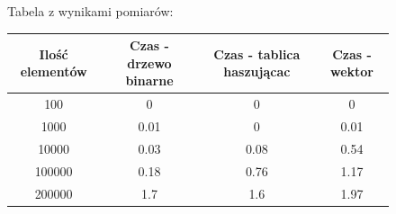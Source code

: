 \documentclass[a4paper,11pt]{report}
\begin{document}
\begin{figure}
  \begin{center}
  Tabela z wynikami pomiarów:\\
  \begin{tabular}{|c|c|c|c|}
  \hline 
  Ilość elementów & Czas - drzewo binarne & Czas - tablica haszującac & Czas - wektor\\
  \hline
  100 & 0 & 0 & 0\\
  \hline
  1000	&	0.01 & 0 & 0.01\\
  \hline
  10000	&	0.03 & 0.08 & 0.54 \\
  \hline
  100000 &	0.18 & 0.76 & 1.17\\
  \hline
  200000 &	1.7 & 1.6 & 1.97\\
  \hline
\end{tabular} 
\end{center}
\end{figure}
\end{document}
